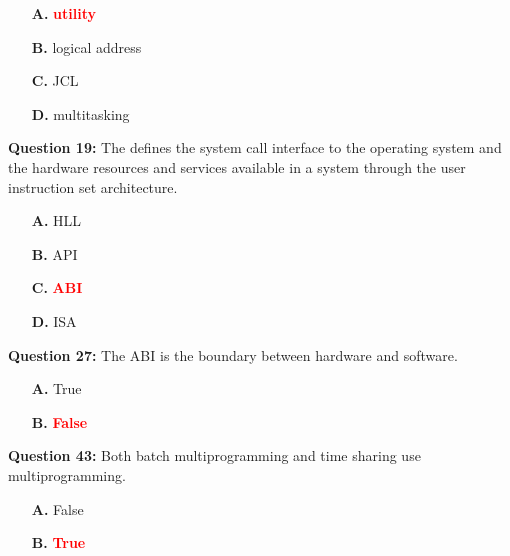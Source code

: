 \documentclass[12pt,a4paper]{article}
\begin{document}
\begin{itemize}
    \item[\textbf{A.}] \textcolor{red}{\textbf{utility}}
    \item[\textbf{B.}] logical address
    \item[\textbf{C.}] JCL
    \item[\textbf{D.}] multitasking
\end{itemize}

\vspace{0.5cm}

\vspace{0.5cm}

\vspace{0.5cm}

\vspace{0.5cm}

\textbf{Question 19:} The \underline{\hspace{1.5cm}} defines the system call interface to the operating system and the hardware resources and services available in a system through the user instruction set architecture.

\begin{itemize}
    \item[\textbf{A.}] HLL
    \item[\textbf{B.}] API
    \item[\textbf{C.}] \textcolor{red}{\textbf{ABI}}
    \item[\textbf{D.}] ISA
\end{itemize}

\vspace{0.5cm}

\vspace{0.5cm}

\textbf{Question 27:} The ABI is the boundary between hardware and software.

\begin{itemize}
    \item[\textbf{A.}] True
    \item[\textbf{B.}] \textcolor{red}{\textbf{False}}
\end{itemize}

\vspace{0.5cm}

\vspace{0.5cm}

\textbf{Question 43:} Both batch multiprogramming and time sharing use multiprogramming.

\begin{itemize}
    \item[\textbf{A.}] False
    \item[\textbf{B.}] \textcolor{red}{\textbf{True}}
\end{itemize}
\end{document}
